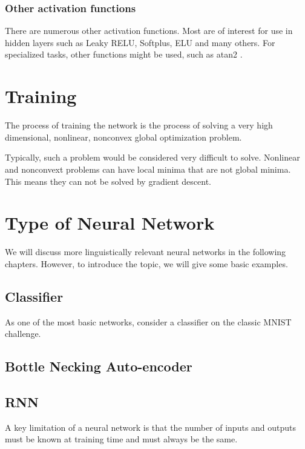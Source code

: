 \documentclass[12pt,parskip]{komatufte}
\begin{document}
\subsubsection{Other activation functions}

There are numerous other activation functions.
Most are of interest for use in hidden layers such as Leaky RELU, Softplus, ELU and many others.
For specialized tasks, other functions might be used, such as atan2 .


\section{Training}
The process of training the network is the process of solving a very high dimensional, nonlinear, nonconvex global optimization problem.


Typically, such a problem would be considered very difficult to solve.
Nonlinear and nonconvext problems can have local minima that are not global minima.
This means they can not be solved by gradient descent.



\section{Type of Neural Network}
We will discuss more linguistically relevant neural networks in the following chapters.
However, to introduce the topic, we will give some basic examples.

\subsection{Classifier}
As one of the most basic networks, consider a classifier on the classic MNIST challenge.

\subsection{Bottle Necking Auto-encoder}

\subsection{RNN}
A key limitation of a neural network is that the number of inputs and outputs must be known at training time and must always be the same.

 
\end{document}
